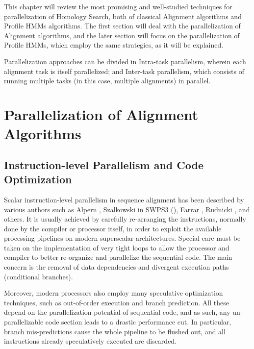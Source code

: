 


This chapter will review the most promising and well-studied techniques for parallelization of Homology Search, both of classical Alignment algorithms and Profile HMMs algorithms. The first section will deal with the parallelization of Alignment algorithms, and the later section will focus on the parallelization of Profile HMMs, which employ the same strategies, as it will be explained.

Parallelization approaches can be divided in Intra-task parallelism, wherein each alignment task is itself parallelized; and Inter-task parallelism, which consists of running multiple tasks (in this case, multiple alignments) in parallel.

\section{Parallelization of Alignment Algorithms}
\label{Parallelization of Alignment Algorithms}

\subsection{Instruction-level Parallelism and Code Optimization}

Scalar instruction-level parallelism in sequence alignment has been described by various authors such as Alpern \cite{alpern}, Szalkowski in SWPS3 (\cite {swps3}), Farrar \cite{farrarcell}, Rudnicki \cite{rudnicki2009cell}, \cite{rognes2011} and others. It is usually achieved by carefully re-arranging the instructions, normally done by the compiler or processor itself, in order to exploit the available processing pipelines on modern superscalar architectures. Special care must be taken on the implementation of very tight loops to allow the processor and compiler to better re-organize and parallelize the sequential code. The main concern is the removal of data dependencies and divergent execution paths (conditional branches).

Moreover, modern processors also employ many speculative optimization techniques, such as out-of-order execution and branch prediction. All these depend on the parallelization potential of sequential code, and as such, any un-parallelizable code section leads to a drastic performance cut. In particular, branch mis-predictions cause the whole pipeline to be flushed out, and all instructions already speculatively executed are discarded.

